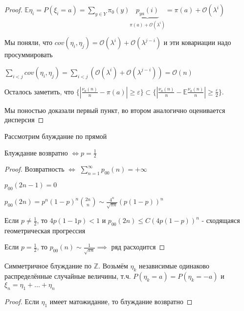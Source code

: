 \begin{proof}
    $\mathbb{E} \eta_i = P(\xi_i = a) = \sum\limits_{y \in Y} \pi_0 (y) \underbrace{p_{ya} (i)}_{\pi (a) + \mathcal{O} (\lambda^i)} = \pi (a) + \mathcal{O} (\lambda^i)$ 

    Мы поняли, что $cov (\eta_i, \eta_j) = \mathcal{O} (\lambda^i) + \mathcal{O} (\lambda^{j - i})$ и эти ковариации надо просуммировать

    $\sum\limits_{i < j} cov (\eta_i, \eta_j) = \sum\limits_{i < j} \left(\mathcal{O} (\lambda^i) + \mathcal{O} (\lambda^{j - i})\right) = \mathcal{O} (n)$

    Осталось заметить, что $\{ \left| \frac{\nu_a (n)}{n} - \pi (a) \right| \geqslant \varepsilon \} \subset \{ \left| \frac{\nu_a (n)}{n} - \mathbb{E} \frac{\nu_a (n)}{n} \right| \geqslant \frac{\varepsilon}{2} \}$.

    Мы поностью доказали первый пункт, во втором аналогично оценивается дисперсия
\end{proof}


\begin{theorem}
    Рассмотрим блуждание по прямой

    Блуждание возвратно $\Longleftrightarrow p = \frac{1}{2}$
\end{theorem}

\begin{proof}
    Возвратность $\Longleftrightarrow$ $\sum\limits_{n=1}^\infty p_{00} (n) = +\infty$

    $p_{00} (2n - 1) = 0$

    $p_{00} (2n) = p^n (1-p)^n \binom{2n}{n} \sim \frac{4^n}{\sqrt{\pi n}} (p(1-p))^n $

    Если $p \neq \frac{1}{2}$, то $4p (1 - 1p) < 1$ и $p_{00} (2n) \leqslant C (4p(1-p))^n $ - сходящаяся геометрическая прогрессия

    Если $p = \frac{1}{2}$, то $p_{00} (n) \sim \frac{1}{\sqrt{\pi n}} \implies$ ряд расходится
\end{proof}

\begin{remark}
    
Симметричное блуждание по $\mathbb{Z}$. Возьмём $\eta_k$ независимые одинаково распределённые случайные величины, т.ч. $P(\eta_k = a) = P(\eta_k = -a)$ и $\xi_n = \eta_1 + \ldots + \eta_n$

\end{remark}

\begin{proof}
    Если $\eta_1$ имеет матожидание, то блуждание возвратно
\end{proof}

